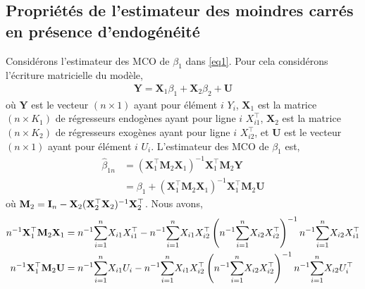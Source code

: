 \documentclass[12pt, reqno]{amsart}
\begin{document}
\subsection{Propriétés de l'estimateur des moindres carrés en présence d'endogénéité}
Considérons l'estimateur des MCO de $\beta_1$ dans \eqref{eq1}. Pour cela considérons l'écriture matricielle du modèle,
\begin{align*}
\mathbf{Y} = \mathbf{X}_1\beta_1 + \mathbf{X}_2\beta_2 + \mathbf{U} 
\end{align*}
où $\mathbf{Y}$ est le vecteur $(n\times 1)$ ayant pour élément $i$ $Y_i$, $\mathbf{X}_1$ est la matrice $(n\times K_1)$ de régresseurs endogènes ayant pour ligne $i$ $X_{i1}^\top$, $\mathbf{X}_2$ est la matrice $(n\times K_2)$ de régresseurs exogènes ayant pour ligne $i$ $X_{i2}^\top$, et $\mathbf{U}$ est le vecteur $(n\times 1)$ ayant pour élément $i$ $U_i$. L'estimateur des MCO de $\beta_1$ est,
\begin{align*}
\widehat{\beta}_{1n} &= (\mathbf{X}_1^\top\mathbf{M}_2\mathbf{X}_1)^{-1}\mathbf{X}_1^\top\mathbf{M}_2\mathbf{Y} \\
&=\beta_1 +(\mathbf{X}_1^\top\mathbf{M}_2\mathbf{X}_1)^{-1}\mathbf{X}_1^\top\mathbf{M}_2\mathbf{U}
\end{align*}
où $\mathbf{M}_2 = \mathbf{I}_n - \mathbf{X}_2(\mathbf{X}_2^\top\mathbf{X}_2)^{-1}\mathbf{X}_2^\top$. Nous avons,
\begin{align*}
n^{-1}\mathbf{X}_1^\top\mathbf{M}_2\mathbf{X}_1 &= n^{-1}\underset{i=1}{\overset{n}{\sum}} X_{i1}X_{i1}^\top - n^{-1}\underset{i=1}{\overset{n}{\sum}} X_{i1}X_{i2}^\top\left(n^{-1}\underset{i=1}{\overset{n}{\sum}} X_{i2}X_{i2}^\top\right)^{-1} n^{-1}\underset{i=1}{\overset{n}{\sum}} X_{i2}X_{i1}^\top\\
n^{-1}\mathbf{X}_1^\top\mathbf{M}_2\mathbf{U} &= n^{-1}\underset{i=1}{\overset{n}{\sum}} X_{i1}U_i - n^{-1}\underset{i=1}{\overset{n}{\sum}} X_{i1}X_{i2}^\top\left(n^{-1}\underset{i=1}{\overset{n}{\sum}} X_{i2}X_{i2}^\top\right)^{-1} n^{-1}\underset{i=1}{\overset{n}{\sum}} X_{i2}U_i^\top
\end{align*}
\end{document}
